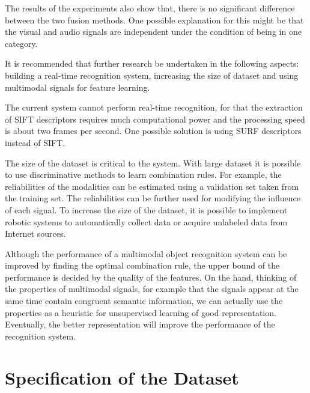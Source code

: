 \documentclass[12pt,final,twoside]{report}
\begin{document}
The results of the experiments also show that, there is no significant difference between the two fusion methods. One possible explanation for this might be that the visual and audio signals are independent under the condition of being in one category.

It is recommended that further research be undertaken in the following aspects: building a real-time recognition system, increasing the size of dataset and using multimodal signals for feature learning.

The current system cannot perform real-time recognition, for that the extraction of SIFT descriptors requires much computational power and the processing speed is about two frames per second. One possible solution is using SURF descriptors instead of SIFT.

The size of the dataset is critical to the system. With large dataset it is possible to use discriminative methods to learn combination rules. For example, the reliabilities of the modalities can be estimated using a validation set taken from the training set. The reliabilities can be further used for modifying the influence of each signal. To increase the size of the dataset, it is possible to implement robotic systems to automatically collect data or acquire unlabeled data from Internet sources.

Although the performance of a multimodal object recognition system can be improved by finding the optimal combination rule, the upper bound of the performance is decided by the quality of the features. On the hand, thinking of the properties of multimodal signals, for example that the signals appear at the same time contain congruent semantic information, we can actually use the properties as a heuristic for unsupervised learning of good representation. Eventually, the better representation will improve the performance of the recognition system.

\cleardoublepage
\appendix

\chapter{Specification of the Dataset}
\label{app:dataset}
\end{document}

